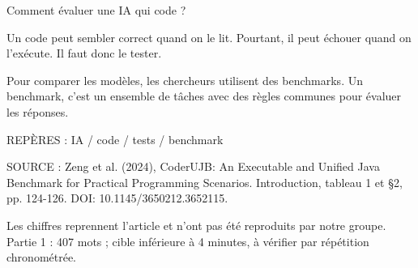\documentclass[aspectratio=169,usepdftitle=false]{beamer}
\begin{document}
\begin{frame}{Comment évaluer une IA qui code ?}
{Un code peut sembler correct quand on le lit. Pourtant, il peut échouer quand on l’exécute. Il faut donc le tester.

Pour comparer les modèles, les chercheurs utilisent des benchmarks. Un benchmark, c’est un ensemble de tâches avec des règles communes pour évaluer les réponses.

REPÈRES : IA  /  code  /  tests  /  benchmark

SOURCE : Zeng et al. (2024), CoderUJB: An Executable and Unified Java Benchmark for Practical Programming Scenarios. Introduction, tableau 1 et §2, pp. 124-126. DOI: 10.1145/3650212.3652115.

Les chiffres reprennent l'article et n'ont pas été reproduits par notre groupe. Partie 1 : 407 mots ; cible inférieure à 4 minutes, à vérifier par répétition chronométrée.
}
\end{frame}

\end{document}
